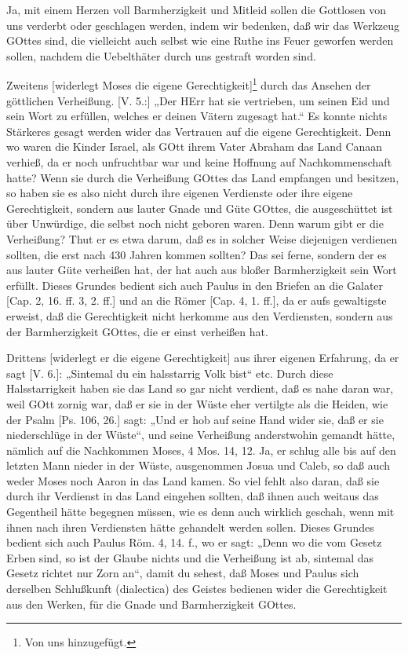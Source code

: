 Ja, mit einem Herzen voll Barmherzigkeit und Mitleid sollen die Gottlosen von uns verderbt oder geschlagen werden, indem wir bedenken, daß wir das Werkzeug GOttes sind, die vielleicht auch selbst wie eine Ruthe ins Feuer geworfen werden sollen, nachdem die Uebelthäter durch uns gestraft worden sind.

Zweitens [widerlegt Moses die eigene Gerechtigkeit]\footnote{Von uns hinzugefügt.} durch das Ansehen der göttlichen Verheißung. [V. 5.:] „Der HErr hat sie vertrieben, um seinen Eid und sein Wort zu erfüllen, welches er deinen Vätern zugesagt hat.“ Es konnte nichts Stärkeres gesagt werden wider das Vertrauen auf die eigene Gerechtigkeit. Denn wo waren die Kinder Israel, als GOtt ihrem Vater Abraham das Land Canaan verhieß, da er noch unfruchtbar war und keine Hoffnung auf Nachkommenschaft hatte? Wenn sie durch die Verheißung GOttes das Land empfangen und besitzen, so haben sie es also nicht durch ihre eigenen Verdienste oder ihre eigene Gerechtigkeit, sondern aus lauter Gnade und Güte GOttes, die ausgeschüttet ist über Unwürdige, die selbst noch nicht geboren waren. Denn warum gibt er die Verheißung? Thut er es etwa darum, daß es in solcher Weise diejenigen verdienen sollten, die erst nach 430 Jahren kommen sollten? Das sei ferne, sondern der es aus lauter Güte verheißen hat, der hat auch aus bloßer Barmherzigkeit sein Wort erfüllt. Dieses Grundes bedient sich auch Paulus in den Briefen an die Galater [Cap. 2, 16. ff. 3, 2. ff.] und an die Römer [Cap. 4, 1. ff.], da er aufs gewaltigste erweist, daß die Gerechtigkeit nicht herkomme aus den Verdiensten, sondern aus der Barmherzigkeit GOttes, die er einst verheißen hat.

Drittens [widerlegt er die eigene Gerechtigkeit] aus ihrer eigenen Erfahrung, da er sagt [V. 6.]: „Sintemal du ein halsstarrig Volk bist“ etc. Durch diese Halsstarrigkeit haben sie das Land so gar nicht verdient, daß es nahe daran war, weil GOtt zornig war, daß er sie in der Wüste eher vertilgte als die Heiden, wie der Psalm [Ps. 106, 26.] sagt: „Und er hob auf seine Hand wider sie, daß er sie niederschlüge in der Wüste“, und seine Verheißung anderstwohin gemandt hätte, nämlich auf die Nachkommen Moses, 4 Mos. 14, 12. Ja, er schlug alle bis auf den letzten Mann nieder in der Wüste, ausgenommen Josua und Caleb, so daß auch weder Moses noch Aaron in das Land kamen. So viel fehlt also daran, daß sie durch ihr Verdienst in das Land eingehen sollten, daß ihnen auch weitaus das Gegentheil hätte begegnen müssen, wie es denn auch wirklich geschah, wenn mit ihnen nach ihren Verdiensten hätte gehandelt werden sollen. Dieses Grundes bedient sich auch Paulus Röm. 4, 14. f., wo er sagt: „Denn wo die vom Gesetz Erben sind, so ist der Glaube nichts und die Verheißung ist ab, sintemal das Gesetz richtet nur Zorn an“, damit du sehest, daß Moses und Paulus sich derselben Schlußkunft (dialectica) des Geistes bedienen wider die Gerechtigkeit aus den Werken, für die Gnade und Barmherzigkeit GOttes.

